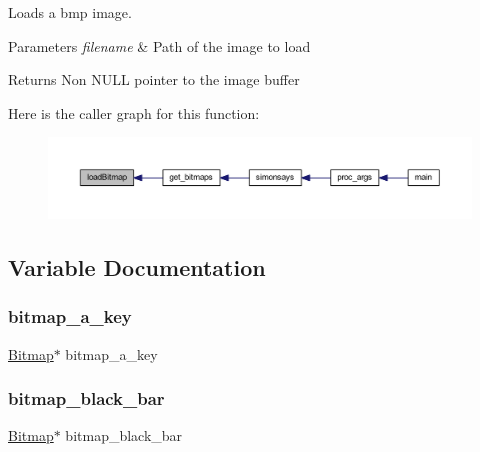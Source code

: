 Loads a bmp image. 


\begin{DoxyParams}{Parameters}
{\em filename} & Path of the image to load \\
\hline
\end{DoxyParams}
\begin{DoxyReturn}{Returns}
Non N\+U\+LL pointer to the image buffer 
\end{DoxyReturn}
Here is the caller graph for this function\+:\nopagebreak
\begin{figure}[H]
\begin{center}
\leavevmode
\includegraphics[width=350pt]{group___bitmap_ga3506880ffd407c36eb8aaddd2c1606d2_icgraph}
\end{center}
\end{figure}


\subsection{Variable Documentation}
\mbox{\label{group___bitmap_ga508d397d656733b6434a84217519cf27}} 
\subsubsection{\texorpdfstring{bitmap\+\_\+a\+\_\+key}{bitmap\_a\_key}}
{\footnotesize\ttfamily \hyperlink{struct_bitmap}{Bitmap}$\ast$ bitmap\+\_\+a\+\_\+key}

\mbox{\label{group___bitmap_ga25ccce5a865640e111d5c3e6fd8405f5}} 
\subsubsection{\texorpdfstring{bitmap\+\_\+black\+\_\+bar}{bitmap\_black\_bar}}
{\footnotesize\ttfamily \hyperlink{struct_bitmap}{Bitmap}$\ast$ bitmap\+\_\+black\+\_\+bar}

